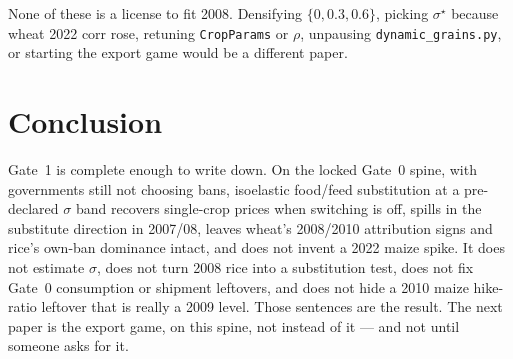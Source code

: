\documentclass[11pt,a4paper]{article}
\begin{document}
None of these is a license to fit 2008. Densifying \(\{0,0.3,0.6\}\),
picking \(\sigma^\star\) because wheat 2022 corr rose, retuning
\texttt{CropParams} or \(\rho\), unpausing \texttt{dynamic\_grains.py}, or
starting the export game would be a different paper.

\section{Conclusion}
\label{sec:conc}

Gate~1 is complete enough to write down. On the locked Gate~0 spine, with
governments still not choosing bans, isoelastic food/feed substitution at
a pre-declared \(\sigma\) band recovers single-crop prices when switching
is off, spills in the substitute direction in 2007/08, leaves wheat's
2008/2010 attribution signs and rice's own-ban dominance intact, and does
not invent a 2022 maize spike. It does not estimate \(\sigma\), does not
turn 2008 rice into a substitution test, does not fix Gate~0 consumption
or shipment leftovers, and does not hide a 2010 maize hike-ratio leftover
that is really a 2009 level. Those sentences are the result. The next
paper is the export game, on this spine, not instead of it --- and not
until someone asks for it.

\appendix



\end{document}
